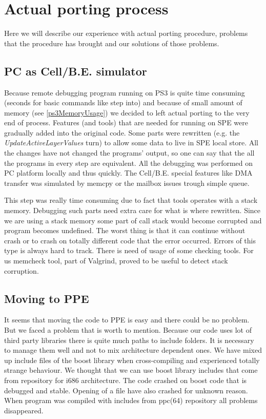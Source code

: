 \section{Actual porting process}

\par
Here we will describe our experience with actual porting procedure, problems that the procedure has brought and our solutions of those problems.

\subsection{PC as Cell/B.E. simulator}

\par
Because remote debugging program running on PS3 is quite time consuming (seconds for basic commands like step into) and because of small amount of memory (see \ref{ps3MemoryUsage}) we decided to left actual porting to the very end of process.
Features (and tools) that are needed for running on SPE were gradually added into the original code.
Some parts were rewritten (e.g. the \emph{UpdateActiveLayerValues} turn) to allow some data to live in SPE local store.
All the changes have not changed the programs' output, so one can say that the all the programs in every step are equivalent.
All the debugging was performed on PC platform locally and thus quickly.
The Cell/B.E. special features like DMA transfer was simulated by memcpy or the mailbox issues trough simple queue.

\par
This step was really time consuming due to fact that tools operates with a stack memory.
Debugging such parts need extra care for what is where rewritten.
Since we are using a stack memory some part of call stack would become corrupted and program becomes undefined.
The worst thing is that it can continue without crash or to crash on totally different code that the error occurred.
Errors of this type is always hard to track.
There is need of usage of some checking tools.
For us memcheck tool, part of Valgrind, proved to be useful to detect stack corruption.

\subsection{Moving to PPE}

\par
It seems that moving the code to PPE is easy and there could be no problem.
But we faced a problem that is worth to mention.
Because our code uses lot of third party libraries there is quite much paths to include folders.
It is necessary to manage them well and not to mix architecture dependent ones.
We have mixed up include files of the boost library when cross-compiling and experienced totally strange behaviour.
We thought that we can use boost library includes that come from repository for i686 architecture.
The code crashed on boost code that is debugged and stable.
Opening of a file have also crashed for unknown reason.
When program was compiled with includes from ppc(64) repository all problems disappeared.

